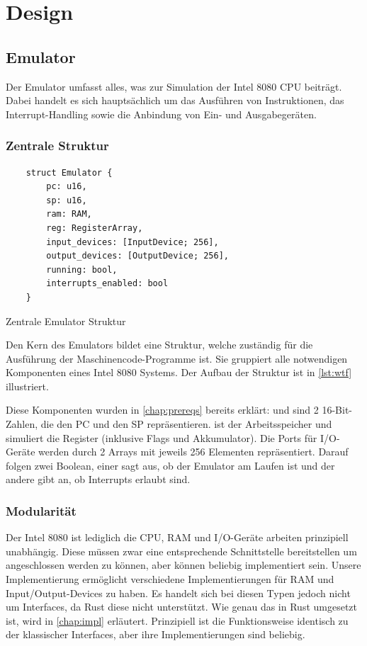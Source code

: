 \chapter{Design}\label{chap:design}

\section{Emulator}

Der Emulator umfasst alles, was zur Simulation der Intel 8080 CPU beiträgt. Dabei handelt es sich hauptsächlich um das Ausführen von Instruktionen, das Interrupt-Handling sowie die Anbindung von Ein- und Ausgabegeräten.

\subsection{Zentrale Struktur}

\begin{listing}[ht]
\begin{verbatim}
    struct Emulator {
        pc: u16,
        sp: u16,
        ram: RAM,
        reg: RegisterArray,
        input_devices: [InputDevice; 256],
        output_devices: [OutputDevice; 256],
        running: bool,
        interrupts_enabled: bool
    }
\end{verbatim}
\centering
\caption{Zentrale Emulator Struktur}
\label{lst:wtf}
\end{listing}

Den Kern des Emulators bildet eine Struktur, welche zuständig für die Ausführung der Maschinencode-Programme ist. Sie gruppiert alle notwendigen Komponenten eines Intel 8080 Systems. Der Aufbau der Struktur ist in \cref{lst:wtf} illustriert.

Diese Komponenten wurden in \cref{chap:prereqs} bereits erklärt:  und  sind 2 16-Bit-Zahlen, die den \ac{PC} und den \ac{SP} repräsentieren.  ist der Arbeitsspeicher und  simuliert die Register (inklusive Flags und Akkumulator).
Die Ports für I/O-Geräte werden durch 2 Arrays mit jeweils 256 Elementen repräsentiert.
Darauf folgen zwei Boolean, einer sagt aus, ob der Emulator am Laufen ist und der andere gibt an, ob Interrupts erlaubt sind.


\subsection{Modularität}

Der Intel 8080 ist lediglich die CPU, \ac{RAM} und I/O-Geräte arbeiten prinzipiell unabhängig. Diese müssen zwar eine entsprechende Schnittstelle bereitstellen um angeschlossen werden zu können, aber können beliebig implementiert sein. Unsere Implementierung ermöglicht verschiedene Implementierungen für \ac{RAM} und Input/Output-Devices zu haben. Es handelt sich bei diesen Typen jedoch nicht um Interfaces, da Rust diese nicht unterstützt. Wie genau das in Rust umgesetzt ist, wird in \cref{chap:impl} erläutert. Prinzipiell ist die Funktionsweise identisch zu der klassischer Interfaces, aber ihre Implementierungen sind beliebig.

